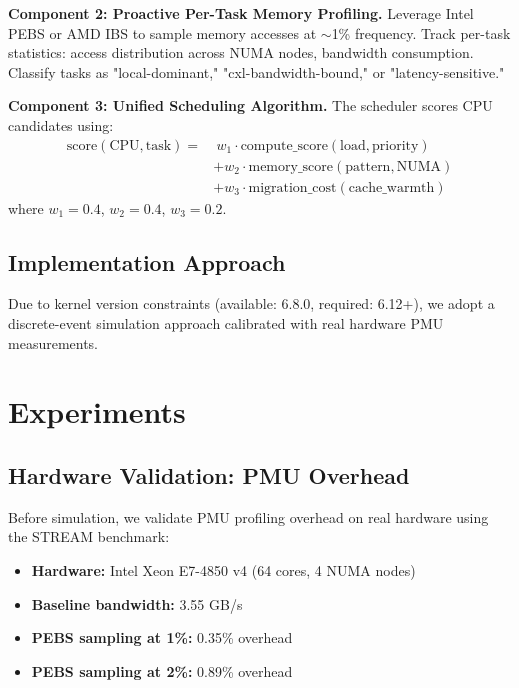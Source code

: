 \documentclass[11pt]{article}
\begin{document}
\textbf{Component 2: Proactive Per-Task Memory Profiling.} Leverage Intel PEBS or AMD IBS to sample memory accesses at $\sim$1\% frequency. Track per-task statistics: access distribution across NUMA nodes, bandwidth consumption. Classify tasks as "local-dominant," "cxl-bandwidth-bound," or "latency-sensitive."

\textbf{Component 3: Unified Scheduling Algorithm.} The scheduler scores CPU candidates using:
\begin{equation}
\begin{split}
\text{score}(\text{CPU}, \text{task}) = &\ w_1 \cdot \text{compute\_score}(\text{load}, \text{priority}) \\
&+ w_2 \cdot \text{memory\_score}(\text{pattern}, \text{NUMA}) \\
&+ w_3 \cdot \text{migration\_cost}(\text{cache\_warmth})
\end{split}
\end{equation}
where $w_1 = 0.4$, $w_2 = 0.4$, $w_3 = 0.2$.

\subsection{Implementation Approach}

Due to kernel version constraints (available: 6.8.0, required: 6.12+), we adopt a discrete-event simulation approach calibrated with real hardware PMU measurements.

\section{Experiments}

\subsection{Hardware Validation: PMU Overhead}

Before simulation, we validate PMU profiling overhead on real hardware using the STREAM benchmark:

\begin{itemize}
    \item \textbf{Hardware:} Intel Xeon E7-4850 v4 (64 cores, 4 NUMA nodes)
    \item \textbf{Baseline bandwidth:} 3.55 GB/s
    \item \textbf{PEBS sampling at 1\%:} 0.35\% overhead
    \item \textbf{PEBS sampling at 2\%:} 0.89\% overhead
\end{itemize}
\end{document}
